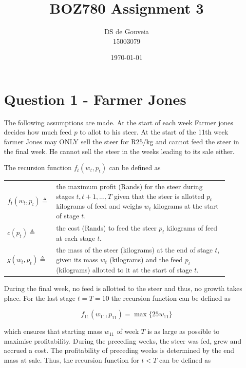 \documentclass[a4paper,11pt]{article}
\title{BOZ780 Assignment 3}
\author{DS de Gouveia \\ 15003079}
\date{\today}
\begin{document}
\maketitle
\tableofcontents
\newpage

\section{Question 1 - Farmer Jones}

The following assumptions are made. At the start of each week Farmer jones decides how much feed $p$ to allot to his steer. At the start of the 11th week farmer Jones may ONLY sell the steer for R25/kg and cannot feed the steer in the final week. He cannot sell the steer in the weeks leading to its sale either.

The recursion function $f_t(w_t, p_t)$ can be defined as

\vspace{12pt}

\begin{tabular}{p{0.12\linewidth}  p{0.78\linewidth}}
	$f_t(w_t,p_t) \triangleq$ & the maximum profit (Rands) for the steer during stages $t,t+1,\dots, T$ given that the steer is allotted $p_t$ kilograms of feed and weighs $w_t$ kilograms at the start of stage $t$. \\
	$c(p_t)\triangleq$ & the cost (Rands) to feed the steer $p_t$ kilograms of feed at each stage $t$. \\
	$g(w_t, p_t) \triangleq$ & the mass of the steer (kilograms) at the end of stage $t$, given its mass $w_t$ (kilograms) and the feed $p_t$ (kilograms) allotted to it at the start of stage $t$.
\end{tabular}
 
 \vspace{12pt}
 
 During the final week, no feed is allotted to the steer and thus, no growth takes place. For the last stage $t=T=10$ the recursion function can be defined as

\begin{equation}
	f_{11}(w_{11},p_{11}) = \max \{25w_{11}	\}
\end{equation}

which ensures that starting mass $w_{11}$ of week $T$ is as large as possible to maximise profitability. During the preceding weeks, the steer was fed, grew and accrued a cost. The profitability of preceding weeks is determined by the end mass at sale. Thus, the recursion function for $t<T$ can be defined as
\end{document}

